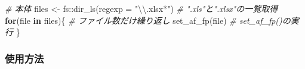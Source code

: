 \documentclass[
]{article}
\newenvironment{Shaded}{\begin{snugshade}}{\end{snugshade}}
\newcommand{\AttributeTok}[1]{\textcolor[rgb]{0.77,0.63,0.00}{#1}}
\newcommand{\CommentTok}[1]{\textcolor[rgb]{0.56,0.35,0.01}{\textit{#1}}}
\newcommand{\ControlFlowTok}[1]{\textcolor[rgb]{0.13,0.29,0.53}{\textbf{#1}}}
\newcommand{\FunctionTok}[1]{\textcolor[rgb]{0.00,0.00,0.00}{#1}}
\newcommand{\NormalTok}[1]{#1}
\newcommand{\OtherTok}[1]{\textcolor[rgb]{0.56,0.35,0.01}{#1}}
\newcommand{\SpecialCharTok}[1]{\textcolor[rgb]{0.00,0.00,0.00}{#1}}
\newcommand{\StringTok}[1]{\textcolor[rgb]{0.31,0.60,0.02}{#1}}
\begin{document}
\begin{Shaded}
\begin{Highlighting}[]
  \CommentTok{\# 本体}
\NormalTok{files }\OtherTok{\textless{}{-}}\NormalTok{ fs}\SpecialCharTok{::}\FunctionTok{dir\_ls}\NormalTok{(}\AttributeTok{regexp =} \StringTok{"}\SpecialCharTok{\textbackslash{}\textbackslash{}}\StringTok{.xlsx*"}\NormalTok{) }\CommentTok{\# ".xls"と".xlsx"の一覧取得}
\ControlFlowTok{for}\NormalTok{(file }\ControlFlowTok{in}\NormalTok{ files)\{                      }\CommentTok{\# ファイル数だけ繰り返し}
  \FunctionTok{set\_af\_fp}\NormalTok{(file)                        }\CommentTok{\# set\_af\_fp()の実行}
\NormalTok{\}}
\end{Highlighting}
\end{Shaded}

\hypertarget{ux4f7fux7528ux65b9ux6cd5}{%
\subsubsection{使用方法}\label{ux4f7fux7528ux65b9ux6cd5}}
\end{document}
